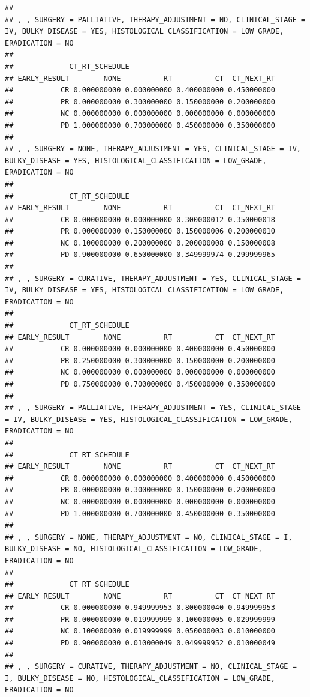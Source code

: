 \documentclass[]{article}
\begin{document}
\begin{verbatim}
## 
## , , SURGERY = PALLIATIVE, THERAPY_ADJUSTMENT = NO, CLINICAL_STAGE = IV, BULKY_DISEASE = YES, HISTOLOGICAL_CLASSIFICATION = LOW_GRADE, ERADICATION = NO
## 
##             CT_RT_SCHEDULE
## EARLY_RESULT        NONE          RT          CT  CT_NEXT_RT
##           CR 0.000000000 0.000000000 0.400000000 0.450000000
##           PR 0.000000000 0.300000000 0.150000000 0.200000000
##           NC 0.000000000 0.000000000 0.000000000 0.000000000
##           PD 1.000000000 0.700000000 0.450000000 0.350000000
## 
## , , SURGERY = NONE, THERAPY_ADJUSTMENT = YES, CLINICAL_STAGE = IV, BULKY_DISEASE = YES, HISTOLOGICAL_CLASSIFICATION = LOW_GRADE, ERADICATION = NO
## 
##             CT_RT_SCHEDULE
## EARLY_RESULT        NONE          RT          CT  CT_NEXT_RT
##           CR 0.000000000 0.000000000 0.300000012 0.350000018
##           PR 0.000000000 0.150000000 0.150000006 0.200000010
##           NC 0.100000000 0.200000000 0.200000008 0.150000008
##           PD 0.900000000 0.650000000 0.349999974 0.299999965
## 
## , , SURGERY = CURATIVE, THERAPY_ADJUSTMENT = YES, CLINICAL_STAGE = IV, BULKY_DISEASE = YES, HISTOLOGICAL_CLASSIFICATION = LOW_GRADE, ERADICATION = NO
## 
##             CT_RT_SCHEDULE
## EARLY_RESULT        NONE          RT          CT  CT_NEXT_RT
##           CR 0.000000000 0.000000000 0.400000000 0.450000000
##           PR 0.250000000 0.300000000 0.150000000 0.200000000
##           NC 0.000000000 0.000000000 0.000000000 0.000000000
##           PD 0.750000000 0.700000000 0.450000000 0.350000000
## 
## , , SURGERY = PALLIATIVE, THERAPY_ADJUSTMENT = YES, CLINICAL_STAGE = IV, BULKY_DISEASE = YES, HISTOLOGICAL_CLASSIFICATION = LOW_GRADE, ERADICATION = NO
## 
##             CT_RT_SCHEDULE
## EARLY_RESULT        NONE          RT          CT  CT_NEXT_RT
##           CR 0.000000000 0.000000000 0.400000000 0.450000000
##           PR 0.000000000 0.300000000 0.150000000 0.200000000
##           NC 0.000000000 0.000000000 0.000000000 0.000000000
##           PD 1.000000000 0.700000000 0.450000000 0.350000000
## 
## , , SURGERY = NONE, THERAPY_ADJUSTMENT = NO, CLINICAL_STAGE = I, BULKY_DISEASE = NO, HISTOLOGICAL_CLASSIFICATION = LOW_GRADE, ERADICATION = NO
## 
##             CT_RT_SCHEDULE
## EARLY_RESULT        NONE          RT          CT  CT_NEXT_RT
##           CR 0.000000000 0.949999953 0.800000040 0.949999953
##           PR 0.000000000 0.019999999 0.100000005 0.029999999
##           NC 0.100000000 0.019999999 0.050000003 0.010000000
##           PD 0.900000000 0.010000049 0.049999952 0.010000049
## 
## , , SURGERY = CURATIVE, THERAPY_ADJUSTMENT = NO, CLINICAL_STAGE = I, BULKY_DISEASE = NO, HISTOLOGICAL_CLASSIFICATION = LOW_GRADE, ERADICATION = NO

\end{verbatim}
\end{document}

